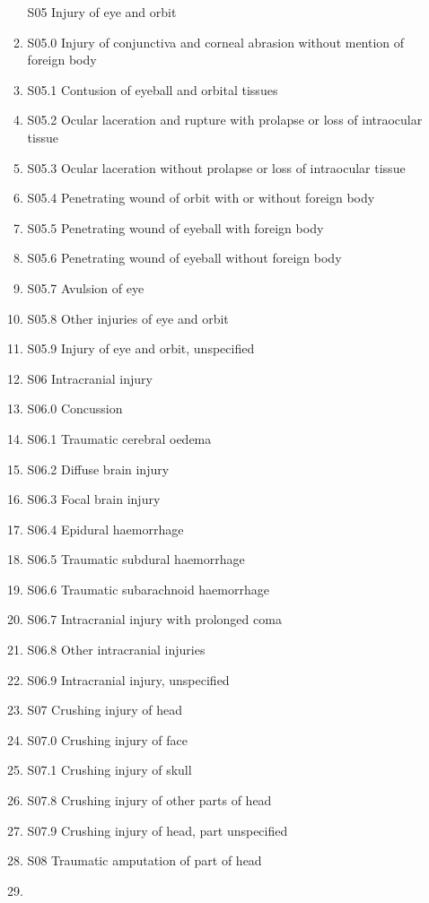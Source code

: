 \documentclass[
]{scrartcl}
\begin{document}
\begin{itemize}
\begin{enumerate}
    S05 Injury of eye and orbit
  \item
    S05.0 Injury of conjunctiva and corneal abrasion without mention of
    foreign body
  \item
    S05.1 Contusion of eyeball and orbital tissues
  \item
    S05.2 Ocular laceration and rupture with prolapse or loss of
    intraocular tissue
  \item
    S05.3 Ocular laceration without prolapse or loss of intraocular
    tissue
  \item
    S05.4 Penetrating wound of orbit with or without foreign body
  \item
    S05.5 Penetrating wound of eyeball with foreign body
  \item
    S05.6 Penetrating wound of eyeball without foreign body
  \item
    S05.7 Avulsion of eye
  \item
    S05.8 Other injuries of eye and orbit
  \item
    S05.9 Injury of eye and orbit, unspecified
  \item
    S06 Intracranial injury
  \item
    S06.0 Concussion
  \item
    S06.1 Traumatic cerebral oedema
  \item
    S06.2 Diffuse brain injury
  \item
    S06.3 Focal brain injury
  \item
    S06.4 Epidural haemorrhage
  \item
    S06.5 Traumatic subdural haemorrhage
  \item
    S06.6 Traumatic subarachnoid haemorrhage
  \item
    S06.7 Intracranial injury with prolonged coma
  \item
    S06.8 Other intracranial injuries
  \item
    S06.9 Intracranial injury, unspecified
  \item
    S07 Crushing injury of head
  \item
    S07.0 Crushing injury of face
  \item
    S07.1 Crushing injury of skull
  \item
    S07.8 Crushing injury of other parts of head
  \item
    S07.9 Crushing injury of head, part unspecified
  \item
    S08 Traumatic amputation of part of head
  \item

\end{enumerate}
\end{itemize}
\end{document}
